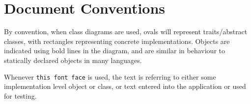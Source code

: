 \documentclass[twoside,10pt]{scrreprt}
\begin{document}
\section{Document Conventions}

By convention, when class diagrams are used, ovals will represent
traits/abstract classes, with rectangles representing concrete implementations.
Objects are indicated using bold lines in the diagram, and are similar
in behaviour to statically declared objects in many languages.

Whenever \texttt{this font face} is used, the text is referring to
either some implementation level object or class, or text entered into the application or used for testing.







\printbibliography
\end{document}
